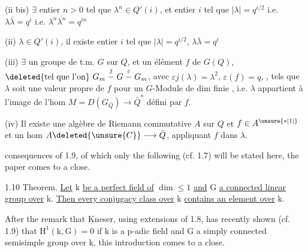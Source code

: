 (ii bis) $\exists$ entier $n>0$ tel que $\lambda^n\in Q'(i)$, et  entier $i$ tel que
$|\lambda|=q^{i/2}$ i.e. $\lambda\bar\lambda=q^i$ i.e. $\lambda^n\overline{\lambda^n}=q^{in}$

(ii) $\lambda\in Q'(i)$, il existe entier $i$ tel que $|\lambda|=q^{i/2}$,  $\lambda\bar\lambda=q^i$

(iii) $\exists$ un groupe de t.m. $G$ sur $Q$, et un élément $f$ de $G(Q)$,
$\deleted{\text{tel que l'on}}\ G_m\mathrel{\mathop{-}\limits^{j}}G\mathrel{\mathop{-}\limits^\varepsilon}G_m$, avec $\varepsilon j(\lambda)=\lambda^2$,
$\varepsilon(f)=q$, , tels que $\lambda$ soit une valeur propre de $f$
pour un $G$-Module de dim finie  , i.e.
$\lambda$ appartient à l'image de l'hom $M=D(G_{\bar Q})\longrightarrow\bar Q^*$
défini par $f$.

(iv) Il existe une algèbre de Riemann commutative $A$ sur $Q$ et $f\in A^{\unsure{*|1|{}}}$
et un hom $A\deleted{\unsure{C}}\longrightarrow\bar Q$, appliquant $f$ dans $\lambda$.

consequences of 1.9, of which only the following (cf. 1.7) will be stated
here, the paper comes to a close.

1.10 Theorem. \uline{Let} $\mathrm{k}$ \uline{be a perfect field of} $\mathrm{\dim\leq 1}$ \uline{and} $\mathrm{G}$ \uline{a
connected linear group over} $\mathrm{k}$. \uline{Then every conjugacy class over} $\mathrm{k}$ \uline{contains
an element over} $\mathrm{k}$.

After the remark that Kneser, using extensions of 1.8, has recently shown
(cf. 1.9) that $\mathrm{H^1(k,G)=0}$ if $\mathrm{k}$ is a $\mathrm{p}$-adic field and $\mathrm{G}$ a simply connected
semisimple group over $\mathrm{k}$, this introduction comes to a close.

